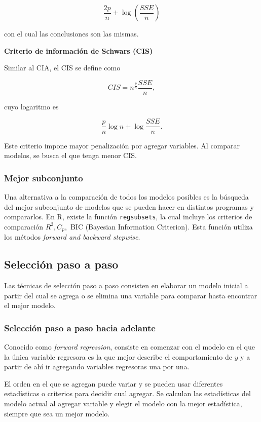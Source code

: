 \documentclass[
]{book}
\begin{document}
\[\frac{2p}{n}+\log(\frac{SSE}{n})\]

con el cual las conclusiones son las mismas.

\textbf{Criterio de información de Schwars (CIS)}

Similar al CIA, el CIS se define como

\[CIS = n^{\frac{p}{n}}\frac{SSE}{n},\]

cuyo logaritmo es

\[\frac{p}{n}\log{n} + \log{\frac{SSE}{n}}.\]

Este criterio impone mayor penalización por agregar variables. Al comparar modelos, se busca el que tenga menor CIS.

\subsubsection{Mejor subconjunto}\label{mejor-subconjunto}

Una alternativa a la comparación de todos los modelos posibles es la búsqueda del mejor subconjunto de modelos que se pueden hacer en distintos programas y compararlos. En R, existe la función \texttt{regsubsets}, la cual incluye los criterios de comparación \(R^2, C_p,\) BIC (Bayesian Information Criterion). Esta función utiliza los métodos \emph{forward and backward stepwise}.

\subsection{Selección paso a paso}\label{selecciuxf3n-paso-a-paso}

Las técnicas de selección paso a paso consisten en elaborar un modelo inicial a partir del cual se agrega o se elimina una variable para comparar hasta encontrar el mejor modelo.

\subsubsection{Selección paso a paso hacia adelante}\label{selecciuxf3n-paso-a-paso-hacia-adelante}

Conocido como \emph{forward regression}, consiste en comenzar con el modelo en el que la única variable regresora es la que mejor describe el comportamiento de \(y\) y a partir de ahí ir agregando variables regresoras una por una.

El orden en el que se agregan puede variar y se pueden usar diferentes estadísticas o criterios para decidir cual agregar. Se calculan las estadísticas del modelo actual al agregar variable y elegir el modelo con la mejor estadística, siempre que sea un mejor modelo.
\end{document}
